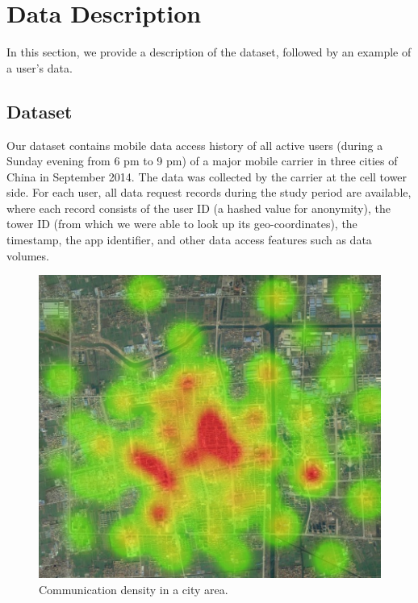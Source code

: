\section{Data Description}\label{data}

In this section, we provide a description of the dataset,
followed by an example of a user's data.

\subsection{Dataset}

Our dataset contains mobile data access history of all active users (during a Sunday evening from 6 pm to 9 pm)
of a major mobile carrier in three cities of China in September 2014. The data was collected by the carrier at the cell tower side.
For each user, all data request records during the study period are available,
where each record consists of the user ID (a hashed value for anonymity),
the tower ID (from which we were able to look up its geo-coordinates),
the timestamp,
the app identifier,
and other data access features such as data volumes.


 \begin{figure}[h]
     \centering
     \includegraphics[width=0.4\linewidth]{./figures/hotmap.jpg}
     \caption{Communication density in a city area.}
     \label{fig:city_sample}
     \vspace{-0.1in}
 \end{figure}

